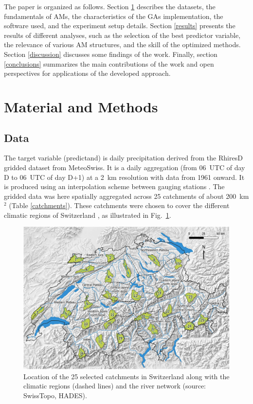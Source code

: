 \documentclass[draft]{agujournal2019}
\begin{document}
The paper is organized as follows. Section \ref{material_methods} describes the datasets, the fundamentals of AMs, the characteristics of the GAs implementation, the software used, and the experiment setup details. Section \ref{results} presents the results of different analyses, such as the selection of the best predictor variable, the relevance of various AM structures, and the skill of the optimized methods. Section \ref{discussion} discusses some findings of the work. Finally, section \ref{conclusions} summarizes the main contributions of the work and open perspectives for applications of the developed approach.


\section{Material and Methods}
\label{material_methods}

\subsection{Data}
\label{data}

The target variable (predictand) is daily precipitation derived from the RhiresD gridded dataset from MeteoSwiss. It is a daily aggregation (from 06~UTC of day D to 06~UTC of day D+1) at a 2~km resolution with data from 1961 onward. It is produced using an interpolation scheme between gauging stations \cite{Frei1998}. The gridded data was here spatially aggregated across 25 catchments of about 200~km$^2$ (Table \ref{catchments}). These catchments were chosen to cover the different climatic regions of Switzerland \cite{Schuepp1980}, as illustrated in Fig.~\ref{map}.


\begin{figure}[hbt]
	\noindent\includegraphics[width=140mm]{figures/map.jpg}
	\caption{Location of the 25 selected catchments in Switzerland along with the climatic regions (dashed lines) and the river network (source: SwissTopo, HADES).}
	\label{map}
\end{figure}
\end{document}

